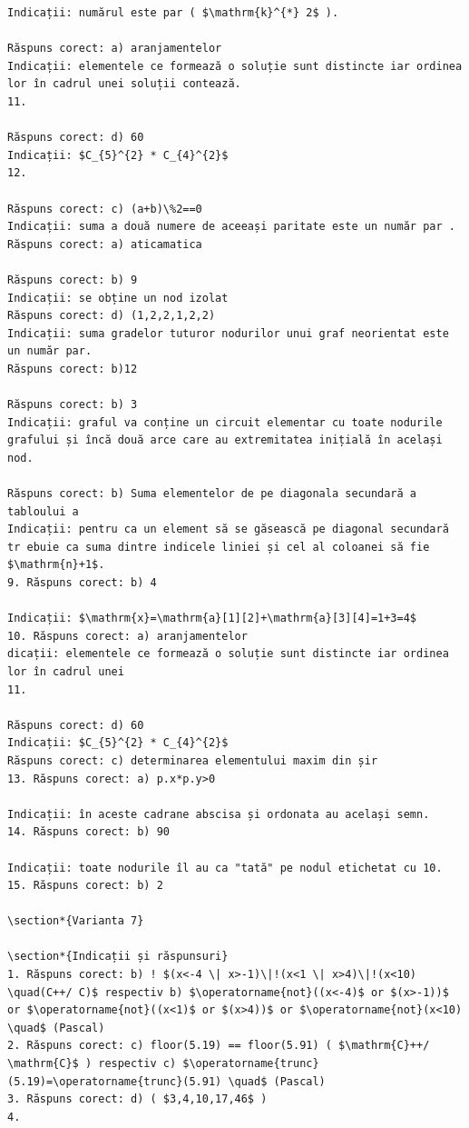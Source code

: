 \documentclass[10pt]{article}
\begin{document}
\begin{verbatim}
Indicații: numărul este par ( $\mathrm{k}^{*} 2$ ).

Răspuns corect: a) aranjamentelor
Indicații: elementele ce formează o soluție sunt distincte iar ordinea lor în cadrul unei soluții contează.
11.

Răspuns corect: d) 60
Indicații: $C_{5}^{2} * C_{4}^{2}$
12.

Răspuns corect: c) (a+b)\%2==0
Indicații: suma a două numere de aceeași paritate este un număr par .
Răspuns corect: a) aticamatica

Răspuns corect: b) 9
Indicații: se obține un nod izolat
Răspuns corect: d) (1,2,2,1,2,2)
Indicații: suma gradelor tuturor nodurilor unui graf neorientat este un număr par.
Răspuns corect: b)12

Răspuns corect: b) 3
Indicații: graful va conține un circuit elementar cu toate nodurile grafului și încă două arce care au extremitatea inițială în același nod.

Răspuns corect: b) Suma elementelor de pe diagonala secundară a tabloului a
Indicații: pentru ca un element să se găsească pe diagonal secundară tr ebuie ca suma dintre indicele liniei și cel al coloanei să fie $\mathrm{n}+1$.
9. Răspuns corect: b) 4

Indicații: $\mathrm{x}=\mathrm{a}[1][2]+\mathrm{a}[3][4]=1+3=4$
10. Răspuns corect: a) aranjamentelor
dicații: elementele ce formează o soluție sunt distincte iar ordinea lor în cadrul unei
11.

Răspuns corect: d) 60
Indicații: $C_{5}^{2} * C_{4}^{2}$
Răspuns corect: c) determinarea elementului maxim din șir
13. Răspuns corect: a) p.x*p.y>0

Indicații: în aceste cadrane abscisa și ordonata au același semn.
14. Răspuns corect: b) 90

Indicații: toate nodurile îl au ca "tată" pe nodul etichetat cu 10.
15. Răspuns corect: b) 2

\section*{Varianta 7}

\section*{Indicații și răspunsuri}
1. Răspuns corect: b) ! $(x<-4 \| x>-1)\|!(x<1 \| x>4)\|!(x<10) \quad(C++/ C)$ respectiv b) $\operatorname{not}((x<-4)$ or $(x>-1))$ or $\operatorname{not}((x<1)$ or $(x>4))$ or $\operatorname{not}(x<10) \quad$ (Pascal)
2. Răspuns corect: c) floor(5.19) == floor(5.91) ( $\mathrm{C}++/ \mathrm{C}$ ) respectiv c) $\operatorname{trunc}(5.19)=\operatorname{trunc}(5.91) \quad$ (Pascal)
3. Răspuns corect: d) ( $3,4,10,17,46$ )
4.


\end{verbatim}
\end{document}
